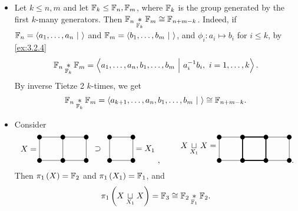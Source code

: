 \begin{example}
\hfill
\begin{itemize}
\item Let $ k \le n, m $ and let $ \mathbb{F}_k \le \mathbb{F}_n, \mathbb{F}_m $, where $ \mathbb{F}_k $ is the group generated by the first $ k $-many generators. Then $ \mathbb{F}_n \underset{\mathbb{F}_k}{*} \mathbb{F}_m \cong \mathbb{F}_{n + m - k} $. Indeed, if $ \mathbb{F}_n = \left\langle a_1, \dots, a_n \ \middle| \  \right\rangle $ and $ \mathbb{F}_m = \left\langle b_1, \dots, b_m \ \middle| \  \right\rangle $, and $ \phi_i : a_i \mapsto b_i $ for $ i \le k $, by \ref{ex:3.2.4}
$$ \mathbb{F}_n \underset{\mathbb{F}_k}{*} \mathbb{F}_m = \left\langle a_1, \dots, a_n, b_1, \dots, b_m \ \middle| \  a_i^{-1}b_i, \ i = 1, \dots, k \right\rangle. $$
By inverse Tietze 2 $ k $-times, we get
$$ \mathbb{F}_n \underset{\mathbb{F}_k}{*} \mathbb{F}_m = \left\langle a_{k + 1}, \dots, a_n, b_1, \dots, b_m \ \middle| \  \right\rangle \cong \mathbb{F}_{n + m - k}. $$
\item Consider
$$
\begin{tikzpicture}
\draw (0, 0.5) node[left]{$ X = $};
\fill (0, 0) circle (0.1);
\fill (1, 0) circle (0.1);
\fill (2, 0) circle (0.1);
\fill (0, 1) circle (0.1);
\fill (1, 1) circle (0.1);
\fill (2, 1) circle (0.1);
\draw (0, 0) to (2, 0);
\draw (0, 1) to (2, 1);
\draw (0, 0) to (0, 1);
\draw (1, 0) to (1, 1);
\draw (2, 0) to (2, 1);
\draw (2.5, 0.5) node{$ \supset $};
\fill (3, 0) circle (0.1);
\fill (4, 0) circle (0.1);
\fill (3, 1) circle (0.1);
\fill (4, 1) circle (0.1);
\draw (3, 0) to (4, 0);
\draw (3, 1) to (4, 1);
\draw (3, 0) to (3, 1);
\draw (4, 0) to (4, 1);
\draw (4, 0.5) node[right]{$ = X_1 $};
\end{tikzpicture},
\qquad
\begin{tikzpicture}
\draw (0, 0.5) node[left]{$ X \underset{X_1}{\sqcup} X = $};
\fill (0, 0) circle (0.1);
\fill (1, 0) circle (0.1);
\fill (2, 0) circle (0.1);
\fill (3, 0) circle (0.1);
\fill (0, 1) circle (0.1);
\fill (1, 1) circle (0.1);
\fill (2, 1) circle (0.1);
\fill (3, 1) circle (0.1);
\draw (0, 0) to (1, 0);
\draw [very thick] (1, 0) to (2, 0);
\draw (2, 0) to (3, 0);
\draw (0, 1) to (1, 1);
\draw [very thick] (1, 1) to (2, 1);
\draw (2, 1) to (3, 1);
\draw (0, 0) to (0, 1);
\draw [very thick] (1, 0) to (1, 1);
\draw [very thick] (2, 0) to (2, 1);
\draw (3, 0) to (3, 1);
\end{tikzpicture}.
$$
Then $ \pi_1\br{X} = \FF_2 $ and $ \pi_1\br{X_1} = \FF_1 $, and
$$ \pi_1\br{X \underset{X_1}{\sqcup} X} = \FF_3 \cong \FF_2 \underset{\FF_1}{*} \FF_2. $$
\end{itemize}
\end{example}

